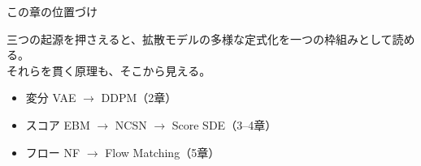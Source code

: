 \begin{frame}{この章の位置づけ}
    \begin{exampleblock}{}
        三つの起源を押さえると、拡散モデルの多様な定式化を一つの枠組みとして読める。\\
        それらを貫く原理も、そこから見える。
    \end{exampleblock}
    \vspace{1em}
    \begin{itemize}
        \item 変分 \quad VAE \(\rightarrow\) DDPM（2章）
        \item スコア \quad EBM \(\rightarrow\) NCSN \(\rightarrow\) Score SDE（3--4章）
        \item フロー \quad NF \(\rightarrow\) Flow Matching（5章）
    \end{itemize}
\end{frame}
